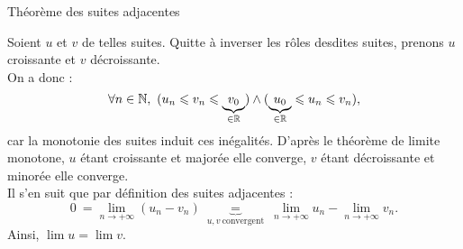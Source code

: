 \documentclass{article}
\renewenvironment{question_kholle}[2][ ]
{
	\subsection{\texorpdfstring{#2}{}}
	\notblank{#1}
	{
		\noindent #1
		\bigbreak
	}
	{}
	\begin{proof}
}
{
	\end{proof}
}
\begin{document}
\begin{question_kholle}
	{Théorème des suites adjacentes}

	Soient $u$ et $v$ de telles suites. Quitte à inverser les rôles
	desdites suites, prenons $u$ croissante et $v$ décroissante. \\
	On a donc :
	\[
		\forall n \in \mathbb N, \ (u_n \leqslant v_n \leqslant \underset{\in
			\mathbb R}{\underbrace{v_0}}) \wedge (\underset{\in
			\mathbb R}{\underbrace{u_0}}\leqslant  u_n \leqslant v_n),
	\]
	car la monotonie des suites induit ces inégalités. D'après le
	théorème de limite monotone, $u$ étant croissante et majorée elle
	converge, $v$ étant décroissante et minorée elle converge. \\
	Il s'en suit que par définition des suites adjacentes :
	\[
		0 \ = \lim_{n \to +\infty} (u_n - v_n) \ \underset{u,v \ \text{
				convergent}}{\underbrace{=}} \ \lim_{n \to +\infty} u_n - \lim_{n
			\to +\infty} v_n.
	\]
	Ainsi, $\lim u = \lim v$.
\end{question_kholle}
\end{document}
